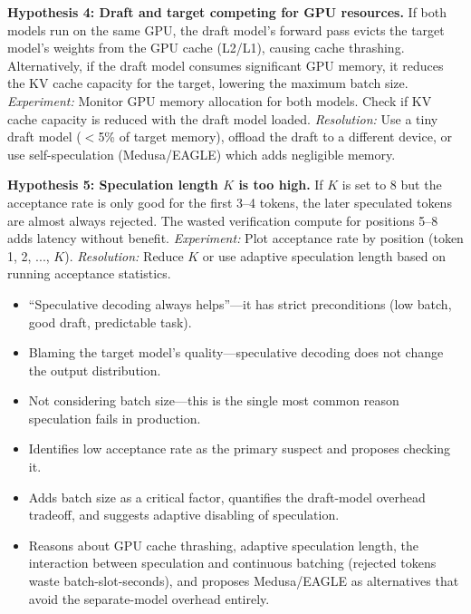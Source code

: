 \begin{interviewq}
\textbf{Hypothesis 4: Draft and target competing for GPU resources.} If both models run on the same GPU, the draft model's forward pass evicts the target model's weights from the GPU cache (L2/L1), causing cache thrashing. Alternatively, if the draft model consumes significant GPU memory, it reduces the KV cache capacity for the target, lowering the maximum batch size. \textit{Experiment:} Monitor GPU memory allocation for both models. Check if KV cache capacity is reduced with the draft model loaded. \textit{Resolution:} Use a tiny draft model ($<$5\% of target memory), offload the draft to a different device, or use self-speculation (Medusa/EAGLE) which adds negligible memory.

\textbf{Hypothesis 5: Speculation length $K$ is too high.} If $K$ is set to 8 but the acceptance rate is only good for the first 3--4 tokens, the later speculated tokens are almost always rejected. The wasted verification compute for positions 5--8 adds latency without benefit. \textit{Experiment:} Plot acceptance rate by position (token 1, 2, ..., $K$). \textit{Resolution:} Reduce $K$ or use adaptive speculation length based on running acceptance statistics.

\redflags
\begin{itemize}
    \item ``Speculative decoding always helps''---it has strict preconditions (low batch, good draft, predictable task).
    \item Blaming the target model's quality---speculative decoding does not change the output distribution.
    \item Not considering batch size---this is the single most common reason speculation fails in production.
\end{itemize}


\goodgreat
\begin{itemize}
    \item {} Identifies low acceptance rate as the primary suspect and proposes checking it.
    \item {} Adds batch size as a critical factor, quantifies the draft-model overhead tradeoff, and suggests adaptive disabling of speculation.
    \item {} Reasons about GPU cache thrashing, adaptive speculation length, the interaction between speculation and continuous batching (rejected tokens waste batch-slot-seconds), and proposes Medusa/EAGLE as alternatives that avoid the separate-model overhead entirely.
\end{itemize}

\end{interviewq}
